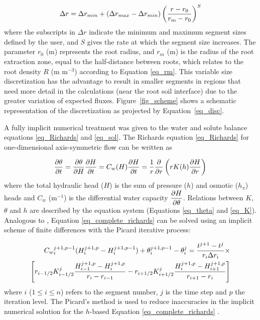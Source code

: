 \label{eq_disc}
\begin{equation}
\Delta r = \Delta r_{min}+(\Delta r_{max}-\Delta r_{min}) \left( {r-r_0 \over r_m-r_0} \right)^S
\end{equation}
%
where the subscripts 
in $\Delta r$ 
indicate the minimum and maximum segment sizes defined by the user, and $S$ gives the rate at which the segment size increases. 
The parameter $r_0$ (m) represents the root radius, and $r_m$ (m) is the radius of the root extraction zone, equal to the half-distance between roots, which relates to the root density $R$ (m m$^{-3}$) according to Equation \ref{eq_rm}.
This variable size discretization has the advantage to result in smaller segments in regions that need more detail in the calculations (near the root soil interface) due to the greater variation of expected fluxes. 
Figure~\ref{fig_scheme} shows a schematic representation of the discretization as projected by Equation~\ref{eq_disc}.

A fully implicit numerical treatment was given to the water and solute balance equations \ref{eq_Richards} and \ref{eq_sol}.
The Richards equation \ref{eq_Richards} for one-dimensional axis-symmetric flow can be written as

\label{eq_complete_richards}
\begin{equation}
{\partial \theta \over \partial t} = {\partial \theta \over \partial H} {\partial H \over \partial t} = C_w(H) {\partial H \over \partial t} = {1 \over r}{\partial \over \partial r} \left( r K(h) {\partial H \over \partial r} \right)
\end{equation}
%
where the total hydraulic head ($H$) is the sum of pressure ($h$) and osmotic ($h_\pi$) heads and $C_w$ (m$^{-1}$) is the differential water capacity $\displaystyle{\partial H \over \partial\theta}$.
Relations between $K$, $\theta$ and $h$ are described by the \cite{genuchten80} equation system (Equations \ref{eq_theta} and \ref{eq_K}).
Analogous to \cite{vandam_feddes}, Equation \ref{eq_complete_richards} can be solved using an implicit scheme of finite differences with the Picard iterative process:

\label{eq_disc_water}
\begin{equation}
\begin{split}
  {C_w}_i^{j+1,p-1} (H_i^{j+1,p} - H_i^{j+1,p-1}) + \theta_i^{j+1,p-1}-\theta_i^j = {t^{j+1}-t^j \over r_i \Delta r_i} \times \\
  \left[  
  r_{i-1/2}K_{i-1/2}^j {H_{i-1}^{j+1,p}-H_i^{j+1,p} \over r_i-r_{i-1}}
  -
  r_{i+1/2}K_{i+1/2}^j {H_{i}^{j+1,p}-H_{i+1}^{j+1,p} \over r_{i+1}-r_{i}}
  \right]
\end{split}
\end{equation}
%
where $i$ ($1 \leq i \leq n$) refers to the segment number, $j$ is the time step and $p$ the iteration level. 
The Picard's method is used to reduce inaccuracies in the implicit numerical solution for the $h$-based Equation \ref{eq_complete_richards} \cite{celia}.

